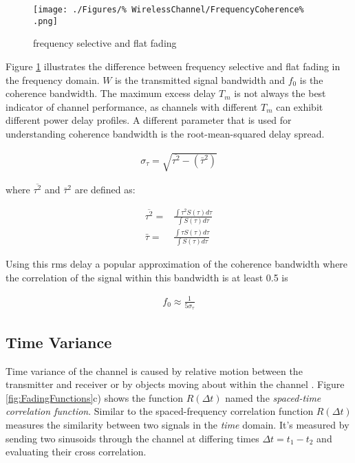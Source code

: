 \begin{figure}[ht]
	\texttt{[image: ./Figures/\%
		WirelessChannel/FrequencyCoherence\%
		.png]}
	\caption{frequency selective and flat fading %
	\cite{Sklar01}}
	\label{fig:FadingFigure}
\end{figure}

Figure \ref{fig:FadingFigure} illustrates the difference %
between frequency selective and flat fading in the %
frequency domain. $W$ is the transmitted signal %
bandwidth and $f_{0}$ is the coherence bandwidth.
\FloatBarrier
The maximum excess delay $T_{m}$ is not always the %
best indicator of channel performance, as channels with %
different $T_{m}$ can exhibit different power delay profiles. %
A different parameter that is used for understanding %
coherence bandwidth is the root-mean-squared delay spread.

\begin{align}
	\sigma_{\tau} = \sqrt{\overline{\tau^{2}} - (\bar{\tau}^{2})}
\end{align}

where $\overline{\tau^{2}}$ and $\bar{\tau}^{2}$ are defined %
as:

\begin{align}
	\overline{\tau^{2}} =&  \frac{\int \tau^{2} S(\tau) d\tau}{\int S(\tau) d\tau} \\
	\bar{\tau} =& \frac{\int \tau S(\tau) d\tau}{\int S(\tau) d\tau}
\end{align}

Using this rms delay a popular approximation of %
the coherence bandwidth where the correlation %
of the signal within this bandwidth is at least 0.5 is

\begin{align}
	f_{0} \approx \frac{1}{5\sigma_{\tau}}
\end{align}

\subsection{Time Variance}
Time variance of the channel is caused by relative %
motion between the transmitter and receiver or by %
objects moving about within the channel \cite{Sklar01}. %
Figure \ref{fig:FadingFunctions}c) shows the function %
$R(\Delta t)$ named the \emph{spaced-time correlation %
function}. Similar to the spaced-frequency correlation %
function $R(\Delta t)$ measures the similarity between %
two signals in the \emph{time} domain. It's measured %
by sending two sinusoids through the channel at differing %
times $\Delta t = t_{1} - t_{2}$ and evaluating their %
cross correlation. 

